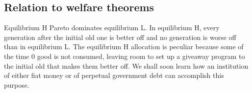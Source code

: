 


\medskip
\subsection{Relation to welfare theorems}

Equilibrium H Pareto dominates
equilibrium L.  In equilibrium H, every generation after the initial
old one is better off and no generation is worse off than in equilibrium
L.
The equilibrium H allocation
is peculiar because some of the time $0$ good is not consumed, leaving
 room to set up a giveaway program to the initial
old that makes them better off.  We shall soon learn how an institution of either fiat money or of perpetual government debt 
can accomplish this purpose.

